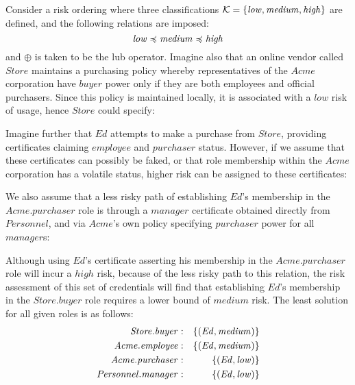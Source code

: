 Consider a risk ordering where three classifications $\mathcal{K} =
\setdefn{\mathit{low,medium,high}}$ are defined, and the following
relations are imposed:
$$
\mathit{low} \po \mathit{medium} \po \mathit{high}
$$ 
and $\oplus$ is taken to be the lub operator.  Imagine also that an
online vendor called $\mathit{Store}$ maintains a purchasing policy
whereby representatives of the $\mathit{Acme}$ corporation have
$\mathit{buyer}$ power only if they are both employees and official
purchasers.  Since this policy is maintained locally, it is associated
with a $\mathit{low}$ risk of usage, hence $\mathit{Store}$ could
specify:
\begin{mathpar}
\end{mathpar}
Imagine further that $\mathit{Ed}$ attempts to make a purchase from
$\mathit{Store}$, providing certificates claiming $\mathit{employee}$
and $\mathit{purchaser}$ status.  However, if we assume that these
certificates can possibly be faked, or that role membership within the
$\mathit{Acme}$ corporation has a volatile status, higher risk can be
assigned to these certificates:
\begin{mathpar}

\end{mathpar}
We also assume that a less risky path of establishing
$\mathit{Ed}$'s membership in the $\mathit{Acme.purchaser}$ role is
through a $\mathit{manager}$ certificate obtained directly from
$\mathit{Personnel}$, and via $\mathit{Acme}$'s own policy specifying
$\mathit{purchaser}$ power for all $\mathit{manager}$s:
\begin{mathpar}

\end{mathpar}
Although using $\mathit{Ed}$'s certificate asserting his membership in
the $\mathit{Acme.purchaser}$ role will incur a $\mathit{high}$ risk,
because of the less risky path to this relation, the risk assessment of
this set of credentials will find that establishing $\mathit{Ed}$'s
membership in the $\mathit{Store.buyer}$ role requires a lower bound of
$\mathit{medium}$ risk.  The least solution for all given roles
is as follows:
\begin{eqnarray*}
\mathit{Store.buyer}&:& \setdefn{(\mathit{Ed, medium})}\\
\mathit{Acme.employee}&:& \setdefn{(\mathit{Ed, medium})}\\
\mathit{Acme.purchaser}&:& \setdefn{(\mathit{Ed, low})}\\
\mathit{Personnel.manager}&:& \setdefn{(\mathit{Ed, low})}
\end{eqnarray*}
